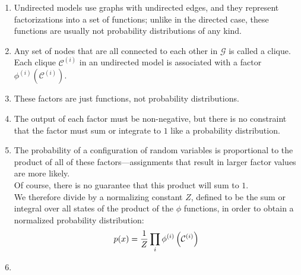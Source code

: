 \begin{enumerate}
    \item Undirected models use graphs with undirected edges, and they represent factorizations into a set of functions; unlike in the directed case, these functions are usually not probability distributions of any kind. 
    
    \item Any set of nodes that are all connected to each other in $\mathcal{G}$ is called a clique. Each clique $\mathcal{C}^{(i)}$ in an undirected model is associated with a factor $\phi^{(i)} (\mathcal{C}^{(i)} )$. 
    
    \item These factors are just functions, not probability distributions. 
    
    \item The output of each factor must be non-negative, but there is no constraint that the factor must sum or integrate to $1$ like a probability distribution.

    \item The probability of a configuration of random variables is proportional to the product of all of these factors—assignments that result in larger factor values are more likely.\\
    Of course, there is no guarantee that this product will sum to $1$.\\
    We therefore divide by a normalizing constant $Z$, defined to be the sum or integral over all states of the product of the $\phi$ functions, in order to obtain a normalized probability distribution:
    \[
        p(x)
        = \dfrac{1}{Z} \displaystyle\prod_i \phi^{(i)} \left(\mathcal{C}^{(i)}\right)
    \]

    \item 
\end{enumerate}






















































